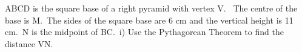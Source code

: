 \documentclass[preview]{standalone}
\begin{document}
\begin{center}
\begin{minipage}{12cm}
\raggedright ABCD is the square base of a right pyramid with vertex V. \
 The centre of the base is M.\
 The sides of the square base are 6 cm and the vertical height is 11 cm.\
 N is the midpoint of BC.\
 i) Use the Pythagorean Theorem to find the distance VN.
\end{minipage}
\end{center}
\end{document}
